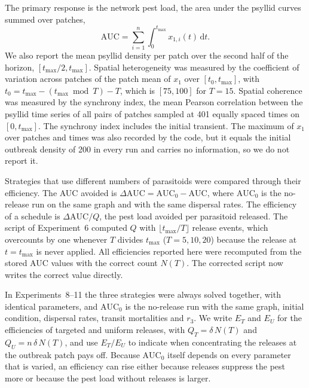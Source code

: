 The primary response is the network pest load, the area under the psyllid curves summed over patches,
\begin{equation}
\mathrm{AUC} = \sum_{i=1}^{n}\int_0^{t_{\max}} x_{1,i}(t)\,\mathrm{d}t .
\end{equation}
We also report the mean psyllid density per patch over the second half of the horizon, $[t_{\max}/2, t_{\max}]$. Spatial heterogeneity was measured by the coefficient of variation across patches of the patch mean of $x_1$ over $[t_0, t_{\max}]$, with $t_0 = t_{\max} - (t_{\max} \bmod T) - T$, which is $[75, 100]$ for $T = 15$. Spatial coherence was measured by the synchrony index, the mean Pearson correlation between the psyllid time series of all pairs of patches sampled at 401 equally spaced times on $[0, t_{\max}]$. The synchrony index includes the initial transient. The maximum of $x_1$ over patches and times was also recorded by the code, but it equals the initial outbreak density of 200 in every run and carries no information, so we do not report it.

Strategies that use different numbers of parasitoids were compared through their efficiency. The AUC avoided is $\Delta\mathrm{AUC} = \mathrm{AUC}_0 - \mathrm{AUC}$, where $\mathrm{AUC}_0$ is the no-release run on the same graph and with the same dispersal rates. The efficiency of a schedule is $\Delta\mathrm{AUC}/Q$, the pest load avoided per parasitoid released. The script of Experiment~6 computed $Q$ with $\lfloor t_{\max}/T\rfloor$ release events, which overcounts by one whenever $T$ divides $t_{\max}$ ($T = 5, 10, 20$) because the release at $t = t_{\max}$ is never applied. All efficiencies reported here were recomputed from the stored AUC values with the correct count $N(T)$. The corrected script now writes the correct value directly.

In Experiments~8--11 the three strategies were always solved together, with identical parameters, and $\mathrm{AUC}_0$ is the no-release run with the same graph, initial condition, dispersal rates, transit mortalities and $r_3$. We write $E_T$ and $E_U$ for the efficiencies of targeted and uniform releases, with $Q_T = \delta\,N(T)$ and $Q_U = n\,\delta\,N(T)$, and use $E_T/E_U$ to indicate when concentrating the releases at the outbreak patch pays off. Because $\mathrm{AUC}_0$ itself depends on every parameter that is varied, an efficiency can rise either because releases suppress the pest more or because the pest load without releases is larger.

